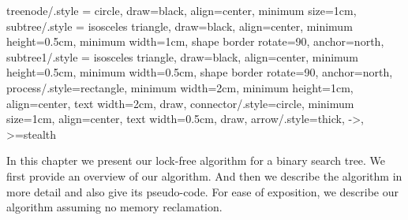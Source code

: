 \begin{limitscope}
\tikzset
{
    treenode/.style = {circle, draw=black, align=center, minimum size=1cm},
    subtree/.style  = {isosceles triangle, draw=black, align=center, minimum height=0.5cm, minimum width=1cm, shape border rotate=90, anchor=north},
    subtree1/.style  = {isosceles triangle, draw=black, align=center, minimum height=0.5cm, minimum width=0.5cm, shape border rotate=90, anchor=north},
    process/.style={rectangle, minimum width=2cm, minimum height=1cm, align=center, text width=2cm, draw},
    connector/.style={circle, minimum size=1cm, align=center, text width=0.5cm, draw},
    arrow/.style={thick, ->, >=stealth}
}
\newcommand{\terminalnode}{terminal node}
\newcommand{\targetnode}{target node}
\newcommand{\accesspath}{access-path}
\newcommand{\nullFlag}{null-flag}
\newcommand{\intentFlag}{intent-flag}
\newcommand{\deleteFlag}{delete-flag}
\newcommand{\promoteFlag}{promote-flag}
\newcommand{\anchornode}{anchor node}
\newcommand{\injection}{injection}
\newcommand{\discovery}{discovery}
\newcommand{\cleanup}{cleanup}

\newcommand{\Search}{\textsc{Search}}
\newcommand{\Insert}{\textsc{Insert}}
\newcommand{\Delete}{\textsc{Delete}}
\newcommand{\Seek}{\textsc{Seek}}
\newcommand{\FindSmallest}{\textsc{FindSmallest}}
\newcommand{\Inject}{\textsc{Inject}}
\newcommand{\FindAndMarkSuccessor}{\textsc{FindAndMarkSuccessor}}
\newcommand{\RemoveSuccessor}{\textsc{RemoveSuccessor}}
\newcommand{\Cleanup}{\textsc{Cleanup}}
\newcommand{\InitializeTypeAndUpdateMode}{\textsc{InitializeTypeAndUpdateMode}}
\newcommand{\UpdateMode}{\textsc{UpdateMode}}
\newcommand{\HelpTargetNode}{\textsc{HelpTargetNode}}
\newcommand{\HelpSuccessorNode}{\textsc{HelpSuccessorNode}}
\newcommand{\MarkChildEdge}{\textsc{MarkChildEdge}}
\newcommand{\remove}[1]{}


\newcommand{\snodeone}{\mathbb{R}}
\newcommand{\snodetwo}{\mathbb{S}}
\newcommand{\snodethree}{\mathbb{T}}
\newcommand{\skey}[1]{\infty_{#1}}


\newcommand{\myleft}{le\!f\!t}
\newcommand{\myright}{right}
\newcommand{\myparent}{parent}


In this chapter we present our lock-free algorithm for a binary search tree. We first provide an overview of our algorithm. And then we describe the algorithm in more detail and also give its pseudo-code. For ease of exposition, we describe our algorithm assuming no memory reclamation.


\end{limitscope}

